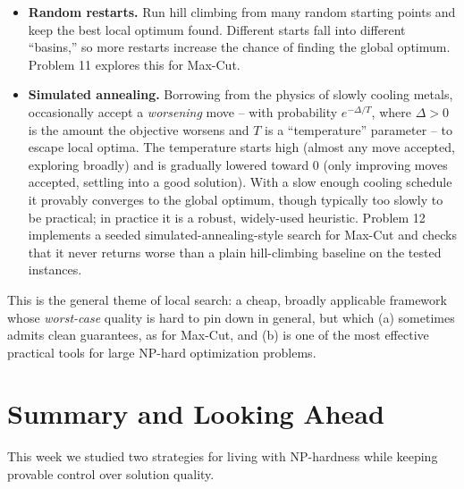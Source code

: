 \documentclass[11pt]{article}
\begin{document}
\begin{itemize}
    \item \textbf{Random restarts.} Run hill climbing from many random starting points and
    keep the best local optimum found. Different starts fall into different ``basins,''
    so more restarts increase the chance of finding the global optimum. Problem 11
    explores this for Max-Cut.

    \item \textbf{Simulated annealing.} Borrowing from the physics of slowly cooling
    metals, occasionally accept a \emph{worsening} move -- with probability
    $e^{-\Delta/T}$, where $\Delta > 0$ is the amount the objective worsens and $T$ is a
    ``temperature'' parameter -- to escape local optima. The temperature starts high
    (almost any move accepted, exploring broadly) and is gradually lowered toward $0$
    (only improving moves accepted, settling into a good solution). With a slow enough
    cooling schedule it provably converges to the global optimum, though typically too
    slowly to be practical; in practice it is a robust, widely-used heuristic. Problem 12
    implements a seeded simulated-annealing-style search for Max-Cut and checks that it
    never returns worse than a plain hill-climbing baseline on the tested instances.
\end{itemize}

This is the general theme of local search: a cheap, broadly applicable framework whose
\emph{worst-case} quality is hard to pin down in general, but which (a) sometimes admits
clean guarantees, as for Max-Cut, and (b) is one of the most effective practical tools for
large NP-hard optimization problems.

\section{Summary and Looking Ahead}

This week we studied two strategies for living with NP-hardness while keeping provable
control over solution quality.
\end{document}
